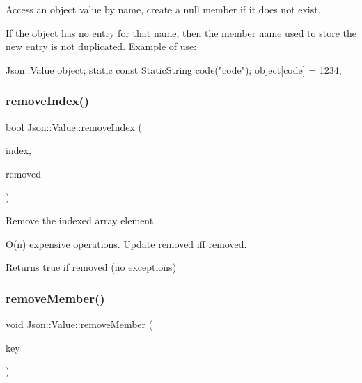 Access an object value by name, create a null member if it does not exist. 

If the object has no entry for that name, then the member name used to store the new entry is not duplicated. Example of use\+: 
\begin{DoxyCode}
\hyperlink{classJson_1_1Value}{Json::Value} object;
\textcolor{keyword}{static} \textcolor{keyword}{const} StaticString code(\textcolor{stringliteral}{"code"});
\textcolor{keywordtype}{object}[code] = 1234;
\end{DoxyCode}
 \mbox{\label{classJson_1_1Value_a64160c23c1f2f8b33913364f25d6c58d}} 
\subsubsection{\texorpdfstring{remove\+Index()}{removeIndex()}}
{\footnotesize\ttfamily bool Json\+::\+Value\+::remove\+Index (\begin{DoxyParamCaption}\item[{Array\+Index}]{index,  }\item[{\hyperlink{classJson_1_1Value}{Value} $\ast$}]{removed }\end{DoxyParamCaption})}



Remove the indexed array element. 

O(n) expensive operations. Update \textquotesingle{}removed\textquotesingle{} iff removed. \begin{DoxyReturn}{Returns}
true if removed (no exceptions) 
\end{DoxyReturn}
\mbox{\label{classJson_1_1Value_a92e165f04105d27a930fb3a18a053585}} 
\subsubsection{\texorpdfstring{remove\+Member()}{removeMember()}\hspace{0.1cm}{\footnotesize\ttfamily [1/4]}}
{\footnotesize\ttfamily void Json\+::\+Value\+::remove\+Member (\begin{DoxyParamCaption}\item[{const char $\ast$}]{key }\end{DoxyParamCaption})}



